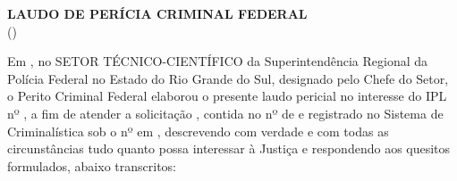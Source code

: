 \noindent\textbf{\@title}

\begin{center}
	\textbf{LAUDO DE PERÍCIA CRIMINAL FEDERAL}\\
	(\pfdocsubtype)
\end{center}

Em 
\pfdocdate,	no SETOR TÉCNICO-CIENTÍFICO da Superintendência
Regional da Polícia Federal no Estado do Rio Grande do Sul, designado pelo Chefe do Setor,	o Perito Criminal Federal 
\pfauthor\space elaborou o presente laudo pericial no interesse do IPL nº \pfipl, a fim de atender a solicitação 
\pfclient, contida no 
\pfexptype\space nº \pfexpnum\space de \pfexpdate\space	e registrado no Sistema de Criminalística sob o nº 
\pfregnum\space em \pfregdate, descrevendo com verdade e com todas as circunstâncias tudo quanto possa interessar à Justiça e respondendo aos	quesitos formulados, abaixo transcritos:

